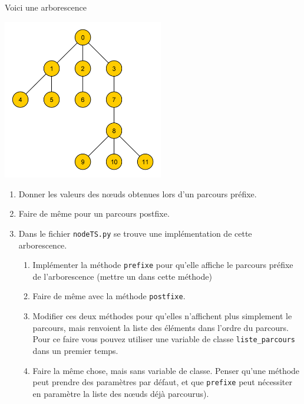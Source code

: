 \documentclass[a4paper,12pt,french]{article}
\begin{document}

\begin{exercice}
Voici une arborescence
\begin{center}
\includegraphics[width=7cm]{img/arbo1}
\end{center}
\begin{enumerate}[\bfseries 1.]
	\item 	Donner les valeurs des n\oe uds obtenues lors d'un parcours préfixe.
	\item 	Faire de même pour un parcours postfixe.
    \item 	Dans le fichier \texttt{nodeTS.py} se trouve une implémentation de cette arborescence.
    \begin{enumerate}[\bfseries a.]
    	\item 	Implémenter la méthode \texttt{prefixe} pour qu'elle affiche le parcours préfixe de l'arborescence (mettre un  dans cette méthode)
    	\item 	Faire de même avec la méthode \texttt{postfixe}.
	    \item 	Modifier ces deux méthodes pour qu'elles n'affichent plus simplement le parcours, mais renvoient la liste des éléments dans l'ordre du parcours. Pour ce faire vous pouvez utiliser une variable de classe \texttt{liste\_parcours} dans un premier temps.
        \item 	Faire la même chose, mais sans variable de classe. Penser qu'une méthode peut prendre des paramètres par défaut, et que \texttt{prefixe} peut nécessiter en paramètre la liste des n\oe uds déjà parcourus).
    \end{enumerate}
\end{enumerate}
\end{exercice}
\end{document}
